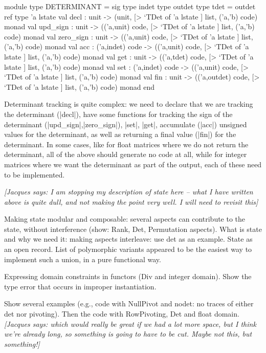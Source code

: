 \documentclass{llncs}
\newcommand{\jacques}[1]{{\it [Jacques says: #1]}}
\begin{document}
\begin{small}
\begin{code}
module type DETERMINANT = sig
  type indet
  type outdet
  type tdet = outdet ref
  type 'a lstate
  val decl : unit -> 
    (unit, [> `TDet of 'a lstate ] list, ('a,'b) code) monad
  val upd_sign : unit -> 
    (('a,unit) code, [> `TDet of 'a lstate ] list, ('a,'b) code) monad
  val zero_sign : unit -> 
    (('a,unit) code, [> `TDet of 'a lstate ] list, ('a,'b) code) monad
  val acc : ('a,indet) code -> 
    (('a,unit) code, [> `TDet of 'a lstate ] list, ('a,'b) code) monad
  val get : unit ->
    (('a,tdet) code, [> `TDet of 'a lstate ] list, ('a,'b) code) monad
  val set : ('a,indet) code -> 
    (('a,unit) code, [> `TDet of 'a lstate ] list, ('a,'b) code) monad
  val fin : unit -> 
    (('a,outdet) code, [> `TDet of 'a lstate ] list, ('a,'b) code) monad
end
\end{code}
\end{small}
\noindent  Determinant tracking is quite complex: we need to 
declare that we are tracking the determinant (|decl|), have some functions
for tracking the sign of the determinant (|upd_sign|,|zero_sign|),
|set|, |get|, accumulate (|acc|) unsigned values for the determinant, as 
well as returning a final value (|fin|) for the determinant.  In some cases,
like for float matrices where we do not return the determinant, all of
the above should generate no code at all, while for integer matrices where
we want the determinant as part of the output, each of these need to be
implemented.

\jacques{I am stopping my description of state here -- what I have
written above is quite dull, and not making the point very well.
I will need to revisit this}

Making state modular and composable: several aspects can contribute
to the state, without interference (show: Rank, Det, Permutation
aspects).
What is state and why we need it: making aspects interleave: use det
as an example. State as an open record. List of polymorphic variants
appeared to be the easiest way to implement such a union, in a pure
functional way.

Expressing domain constraints in functors (Div and integer domain).
Show the type error that occurs in improper instantiation.

Show several examples (e.g., code with NullPivot and nodet: no traces
of either det nor pivoting). Then the code with RowPivoting, Det and
float domain. \jacques{which would really be great if we had a lot 
more space, but I think we're already long, so something is going to
have to be cut.  Maybe not this, but something!}
\end{document}
